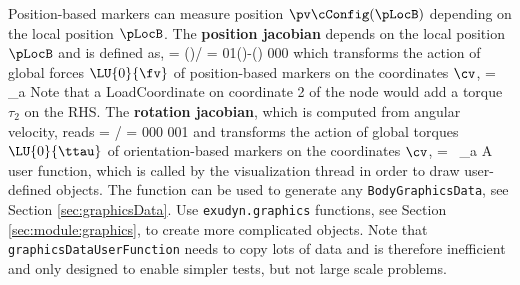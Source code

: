     Position-based markers can measure position $\pv\cConfig(\pLocB)$ depending on the local position $\pLocB$. 
    The {\bf position jacobian} depends on the local position $\pLocB$ and is defined as,
    \be
       = \partial {}\cConfig(\pLocB)\cCur / \partial \cv\cCur =  
                                                             {0}{1}{\cos(\theta)-\sin(\theta)} {0}{0}{0}
    \ee
    which transforms the action of global forces $\LU{0}{\fv}$ of position-based markers on the coordinates $\cv$,
    \be
      \Qm =  _a
    \ee
    Note that a LoadCoordinate on coordinate 2 of the node would add a torque $\tau_2$ on the RHS.
    The {\bf rotation jacobian}, which is computed from angular velocity, reads
    \be
       = \partial {}\cCur / \partial \dot \cv\cCur =  {0}{0}{0} {0}{0}{1}
    \ee
    and transforms the action of global torques $\LU{0}{\ttau}$ of orientation-based markers on the coordinates $\cv$,
    \be
      \Qm =  \, _a
    \ee
    A user function, which is called by the visualization thread in order to draw user-defined objects.
    The function can be used to generate any \texttt{BodyGraphicsData}, see Section \ref{sec:graphicsData}.
    Use \texttt{exudyn.graphics} functions, see Section \ref{sec:module:graphics}, to create more complicated objects. 
    Note that \texttt{graphicsDataUserFunction} needs to copy lots of data and is therefore
    inefficient and only designed to enable simpler tests, but not large scale problems.

